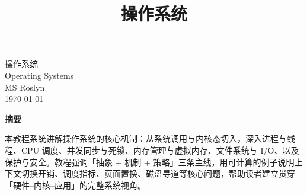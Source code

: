 \documentclass[12pt,a4paper]{ctexrep}
\title{\textbf{\huge 操作系统}}
\author{}
\date{}
\begin{document}
\clearpage
\thispagestyle{empty}
\vspace*{\fill}

\begin{center}
{\huge 操作系统}\\[0.8em]
{\large Operating Systems}\\[2.5em]
{\large MS Roslyn}\\[0.6em]
{\large \today}
\end{center}

\vspace{2.5em}

\begin{center}
{\bfseries 摘要}
\end{center}

\vspace{1em}

\begin{center}
本教程系统讲解操作系统的核心机制：从系统调用与内核态切入，深入进程与线程、CPU 调度、并发同步与死锁、内存管理与虚拟内存、文件系统与 I/O、以及保护与安全。教程强调「抽象 + 机制 + 策略」三条主线，用可计算的例子说明上下文切换开销、调度指标、页面置换、磁盘寻道等核心问题，帮助读者建立贯穿「硬件--内核--应用」的完整系统视角。
\end{center}

\vspace*{\fill}
\clearpage

\tableofcontents
\newpage

\clearpage

\clearpage

\clearpage

\clearpage

\clearpage

\clearpage

\clearpage

\clearpage

\clearpage

\end{document}
